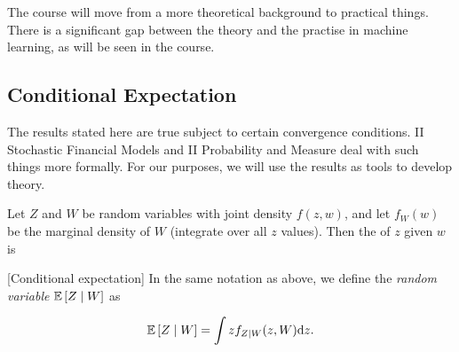 \documentclass[11pt]{scrartcl}
\begin{document}
The course will move from a more theoretical background to practical things. There is a significant gap between the theory and the practise in machine learning, as will be seen in the course.




\subsection{Conditional Expectation}

The results stated here are true subject to certain convergence conditions. II Stochastic Financial Models and II Probability and Measure deal with such things more formally. For our purposes, we will use the results as tools to develop theory.


\begin{definition}
Let $Z$ and $W$ be random variables with joint density $f(z,w)$, and let $f_W(w)$ be the marginal density of $W$ (integrate over all $z$ values). Then the  of $z$ given $w$ is


[Conditional expectation]
In the same notation as above, we define the \emph{random variable} $\mathbb{E} \left[ Z\mid W \right]$ as

\begin{equation}
    \mathbb{E} \left[ Z\mid W \right] = \int z f_{Z\mid W}(z,W) \mathrm{d}z.
\end{equation}
\end{definition}
\end{document}
